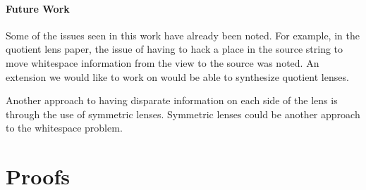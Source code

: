 \documentclass[numbers,10pt,preprint\ifanon ,nocopyrightspace\fi]{sigplanconf}
\begin{document}


\paragraph*{Future Work}
Some of the issues seen in this work have already been noted.  For example, in the
quotient lens paper, the issue of having to hack a place in the source string to
move whitespace information from the view to the source was noted.  An extension
we would like to work on would be able to synthesize quotient lenses.

Another approach to having disparate information on each side of the lens is
through the use of symmetric lenses.  Symmetric lenses could be another approach to the
whitespace problem.



\appendix

\ifanon\else
\acks 
\fi







\ifappendices



\onecolumn
\section{Proofs}
\end{document}
